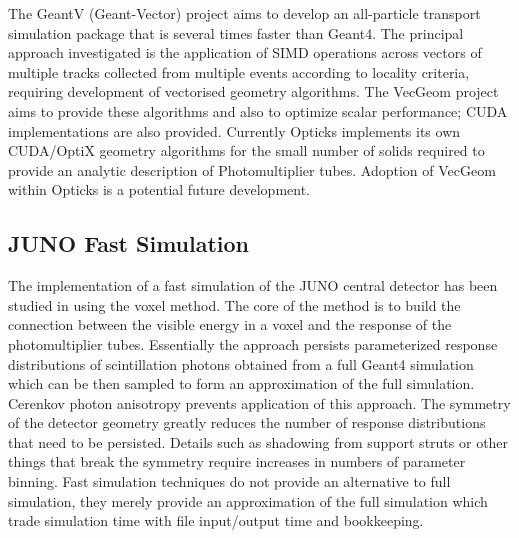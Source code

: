 \documentclass[a4paper]{jpconf}
\begin{document}
The GeantV\cite{GeantV} (Geant-Vector) project aims 
to develop an all-particle transport simulation package that is 
several times faster than Geant4. The principal approach investigated 
is the application of SIMD operations across vectors of multiple tracks 
collected from multiple events according to locality criteria, requiring
development of vectorised geometry algorithms.  
The VecGeom\cite{VecGeom} project aims to provide these algorithms and also 
to optimize scalar performance; CUDA implementations are also provided.
%
Currently Opticks implements its own CUDA/OptiX geometry algorithms
for the small number of solids required to provide an analytic description 
of Photomultiplier tubes. 
Adoption of VecGeom within Opticks is a potential future development.

\subsection{JUNO Fast Simulation}

The implementation of a fast simulation of the JUNO central detector has 
been studied in\cite{junoFastSim} using the voxel method. The core
of the method is to build the connection between the visible energy
in a voxel and the response of the photomultiplier tubes.
Essentially the approach persists parameterized response distributions 
of scintillation photons obtained from a full Geant4 simulation which 
can be then sampled to form an approximation of the full simulation.
Cerenkov photon anisotropy prevents application of this approach.
The symmetry of the detector geometry greatly reduces the number of 
response distributions that need to be persisted. Details such as 
shadowing from support struts or other things that break the symmetry 
require increases in numbers of parameter binning.  
%
Fast simulation techniques do not provide an alternative to full simulation, 
they merely provide an approximation of the full simulation which trade 
simulation time with file input/output time and bookkeeping. 

%
%
%
\end{document}
